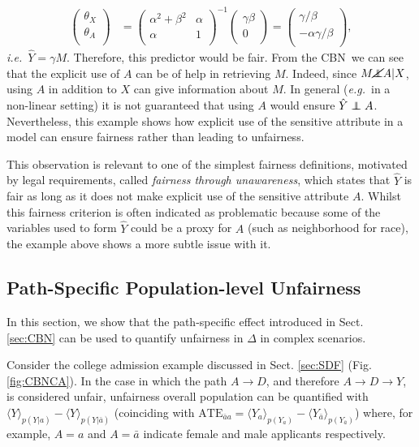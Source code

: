 \documentclass[runningheads]{llncs}
\newcommand{\figref}[1]{Fig. \ref{#1}}
\newcommand{\secref}[1]{Sect. \ref{#1}}
\newcommand\independent{\protect\mathpalette{\protect\independenT}{\perp}}
\def\independenT#1#2{\mathrel{\rlap{$#1#2$}\mkern2mu{#1#2}}}
\newcommand{\av}[1]{\langle #1 \rangle}
\newcommand{\ie}{\emph{i.e.}}
\newcommand{\eg}{\emph{e.g.}}
\newcommand{\CBN}{CBN}
\begin{document}
\begin{align*}
\left(\begin{array}{c}
\theta_X \\
\theta_A \\
\end{array} \right)
&=\left(
\begin{array}{cc}
\alpha^2+\beta^2 & \alpha \\
\alpha  & 1 \\
\end{array} \right)^{-1}
\left(\begin{array}{c}
\gamma\beta  \\
0\\
\end{array} \right)
=\left(\begin{array}{c}
\gamma/\beta \\
-\alpha\gamma/\beta \\
\end{array} \right),
\end{align*}
\ie~$\hat Y = \gamma M$.
Therefore, this predictor would be fair. From the \CBN~we can see that the explicit use of $A$ can be of help in retrieving $M$. Indeed, since $M\cancel{\independent} A |X$, using $A$ in addition to $X$ can give information about $M$. In general (\eg~in a non-linear setting) it is not guaranteed that using $A$ would ensure $\hat Y \independent A$. Nevertheless, this example shows how explicit use of the sensitive attribute in a model can ensure fairness rather than leading to unfairness. 

This observation is relevant to one of the simplest fairness definitions, motivated by legal requirements, called \emph{fairness through unawareness}, which states that $\hat Y$ is fair as long as it does not make explicit use of the sensitive attribute $A$. Whilst this fairness criterion is often indicated as problematic because some of the variables used to form $\hat Y$ could be a proxy for $A$ (such as neighborhood for race), the example above shows a more subtle issue with it.

\subsection{Path-Specific Population-level Unfairness}
In this section, we show that the path-specific effect introduced in \secref{sec:CBN} can be used to quantify unfairness in $\Delta$ in complex scenarios. 

Consider the college admission example discussed in \secref{sec:SDF} (\figref{fig:CBNCA}). In the case in which the path $A\rightarrow D$, and therefore $A\rightarrow D\rightarrow Y$, is considered unfair, unfairness overall population can be quantified with $\av{Y}_{p(Y|a)}-\av{Y}_{p(Y|{\bar a})}$ (coinciding with $\textrm{ATE}_{\bar a a} = \av{Y_{a}}_{p(Y_{a})}-\av{Y_{\bar a}}_{p(Y_{\bar a})}$) where, for example, $A=a$ and $A=\bar a$ indicate female and male applicants respectively. 
\end{document}
